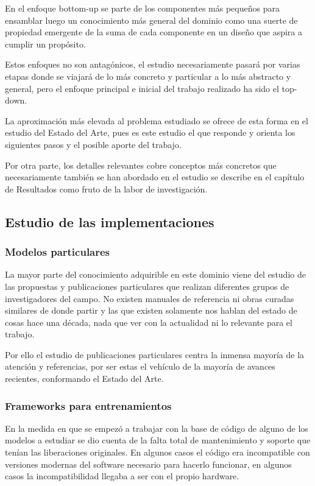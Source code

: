 En el enfoque bottom-up se parte de los componentes más pequeños para ensamblar luego un conocimiento más general del dominio como una suerte de propiedad emergente de la suma de cada componente en un diseño que aspira a cumplir un propósito.

Estos enfoques no son antagónicos, el estudio necesariamente pasará por varias etapas donde se viajará de lo más concreto y particular a lo más abstracto y general, pero el enfoque principal e inicial del trabajo realizado ha sido el top-down.

La aproximación más elevada al problema estudiado se ofrece de esta forma en el estudio del Estado del Arte, pues es este estudio el que responde y orienta los siguientes pasos y el posible aporte del trabajo.

Por otra parte, los detalles relevantes cobre conceptos más concretos que necesariamente también se han abordado en el estudio se describe en el capítulo de Resultados como fruto de la labor de investigación.

\subsection{Estudio de las implementaciones}

\subsubsection{Modelos particulares}

La mayor parte del conocimiento adquirible en este dominio viene del estudio de las propuestas y publicaciones particulares que realizan diferentes grupos de investigadores del campo. No existen manuales de referencia ni obras curadas similares de donde partir y las que existen solamente nos hablan del estado de cosas hace una década, nada que ver con la actualidad ni lo relevante para el trabajo.

Por ello el estudio de publicaciones particulares centra la inmensa mayoría de la atención y referencias, por ser estas el vehículo de la mayoría de avances recientes, conformando el Estado del Arte.

\subsubsection{Frameworks para entrenamientos}

En la medida en que se empezó a trabajar con la base de código de alguno de los modelos a estudiar se dio cuenta de la falta total de mantenimiento y soporte que tenían las liberaciones originales. En algunos casos el código era incompatible con versiones modernas del software necesario para hacerlo funcionar, en algunos casos la incompatibilidad llegaba a ser con el propio hardware.


